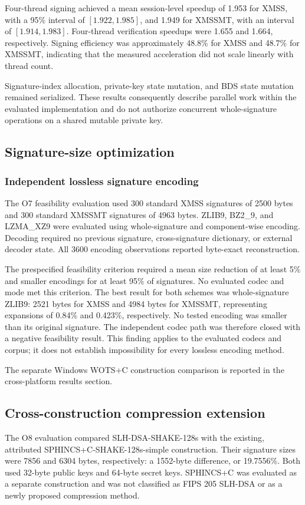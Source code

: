 \documentclass[pdflatex,sn-mathphys-num]{sn-jnl}
\begin{document}
Four-thread signing achieved a mean session-level speedup of 1.953
for XMSS, with a 95\% interval of $[1.922,1.985]$, and 1.949 for
XMSSMT, with an interval of $[1.914,1.983]$. Four-thread verification
speedups were 1.655 and 1.664, respectively. Signing efficiency was
approximately 48.8\% for XMSS and 48.7\% for XMSSMT, indicating that
the measured acceleration did not scale linearly with thread count.

Signature-index allocation, private-key state mutation, and BDS state
mutation remained serialized. These results consequently describe
parallel work within the evaluated implementation and do not authorize
concurrent whole-signature operations on a shared mutable private key.

\subsection{Signature-size optimization}
\label{subsec:signature_size}
\subsubsection{Independent lossless signature encoding}
The O7 feasibility evaluation used 300 standard XMSS signatures
of 2500 bytes and 300 standard XMSSMT signatures of 4963 bytes.
ZLIB9, BZ2\_9, and LZMA\_XZ9 were evaluated using whole-signature
and component-wise encoding. Decoding required no previous
signature, cross-signature dictionary, or external decoder state.
All 3600 encoding observations reported byte-exact reconstruction.

The prespecified feasibility criterion required a mean size
reduction of at least 5\% and smaller encodings for at least 95\%
of signatures. No evaluated codec and mode met this criterion.
The best result for both schemes was whole-signature ZLIB9:
2521 bytes for XMSS and 4984 bytes for XMSSMT, representing
expansions of 0.84\% and 0.423\%, respectively. No tested encoding
was smaller than its original signature. The independent codec
path was therefore closed with a negative feasibility result.
This finding applies to the evaluated codecs and corpus; it does
not establish impossibility for every lossless encoding method.

The separate Windows WOTS+C construction comparison is reported
in the cross-platform results section.

\subsection{Cross-construction compression extension}
\label{subsec:cross_construction}
The O8 evaluation compared SLH-DSA-SHAKE-128s with the existing,
attributed SPHINCS+C-SHAKE-128s-simple construction. Their
signature sizes were 7856 and 6304 bytes, respectively: a
1552-byte difference, or 19.7556\%. Both used 32-byte public
keys and 64-byte secret keys. SPHINCS+C was evaluated as a
separate construction and was not classified as FIPS 205
SLH-DSA or as a newly proposed compression method.
\end{document}
